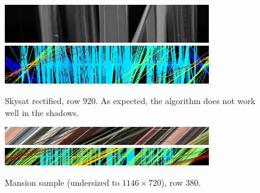 \documentclass{article}
\def\epiWidth{0.8}
\theoremstyle{definition}
\begin{document}
\begin{figure}[ht]
  \centering
  \includegraphics[width=\epiWidth\textwidth]{1520205074004_epi.png}\\
  \includegraphics[width=\epiWidth\textwidth]{1520205074004_epi_colored.png}
  \caption{Skysat rectified, row 920. As expected, the algorithm does not work well in the shadows.}
\end{figure}


\begin{figure}[ht]
  \centering
  \includegraphics[width=\epiWidth\textwidth]{1520202945623_epi.png}\\
  \includegraphics[width=\epiWidth\textwidth]{1520202945623_epi_colored.png}
  \caption{Mansion sample (undersized to $1146\times 720$), row 380.}
\end{figure}


\clearpage


\end{document}
